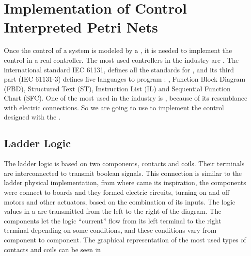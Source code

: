 \usetikzlibrary{arrows,shapes,circuits.plc.ladder,external}

\section{Implementation of Control Interpreted Petri Nets}
\label{sec:implementPetriNets}
Once the control of a system is modeled by a \CIPN, it
is needed to implement the control in a real controller. The most used
controllers in the industry are \PLCs. The international standard IEC 61131,
defines all the standards for \PLCs, and its third part (IEC 61131-3) defines
five languages to program \PLCs: \LD, Function Block Diagram
(FBD),  Structured Text (ST), Instruction List (IL) and Sequential Function
Chart (SFC). One of the most used in the industry is \LD, because of its
resemblance with electric connections. So we are going to use \LD{} to implement the
control designed with the \CIPN.

\subsection{Ladder Logic}
\label{sec:ladder}

The ladder logic is based on two components, contacts and coils. Their terminals are
interconnected to transmit boolean signals. This connection is similar to the
ladder physical implementation, from where came its inspiration, the components
were connect to boards and they formed electric circuits, turning on and off
motors and other actuators, based on the combination of its inputs. The logic
values in a \LD
are transmitted from the left to the right of the diagram. The components let
the logic ``current'' flow from its left terminal to the right terminal
depending on some conditions, and these conditions vary from component to component.
 The graphical representation of the most used types of contacts and coils
can be seen in 

\newlength{\ladderskip}
\newlength{\ladderrungsep}

